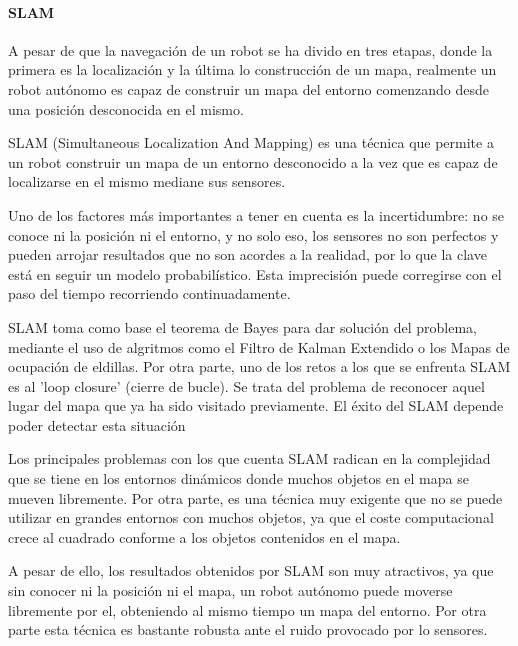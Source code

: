 \paragraph{SLAM} \hspace{0pt}

A pesar de que la navegación de un robot se ha divido en tres etapas, donde la
primera es la localización y la última lo construcción de un mapa, realmente un
robot autónomo es capaz de construir un mapa del entorno comenzando desde una
posición desconocida en el mismo.

SLAM (Simultaneous Localization And Mapping) es una técnica que permite a un
robot construir un mapa de un entorno desconocido a la vez que es capaz de
localizarse en el mismo mediane sus sensores. 

Uno de los factores más importantes a tener en cuenta es la incertidumbre: no se
conoce ni la posición ni el entorno, y no solo eso, los sensores no son
perfectos y pueden arrojar resultados que no son acordes a la realidad,  por lo
que la clave está en seguir un modelo probabilístico. Esta imprecisión puede
corregirse con el paso del tiempo recorriendo continuadamente.


SLAM toma como base el teorema de Bayes para dar solución del problema, mediante
el uso de algritmos como el Filtro de Kalman Extendido o los Mapas de ocupación
de eldillas. Por otra parte, uno de los retos a los que se enfrenta SLAM es al
'loop closure' (cierre de bucle). Se trata del problema de reconocer aquel lugar
del mapa que ya ha sido visitado previamente. El éxito del SLAM depende poder
detectar esta situación

Los principales problemas con los que cuenta SLAM radican en la complejidad que
se tiene en los entornos dinámicos donde muchos objetos en el mapa se mueven
libremente. Por otra parte, es una técnica muy exigente que no se puede utilizar
en grandes entornos con muchos objetos, ya que el coste computacional crece al
cuadrado conforme a los objetos contenidos en el mapa.

A pesar de ello, los resultados obtenidos por SLAM son muy atractivos, ya que
sin conocer ni la posición ni el mapa, un robot autónomo puede moverse
libremente por el, obteniendo al mismo tiempo un mapa del entorno. Por otra
parte esta técnica es bastante robusta ante el ruido provocado por lo sensores.

